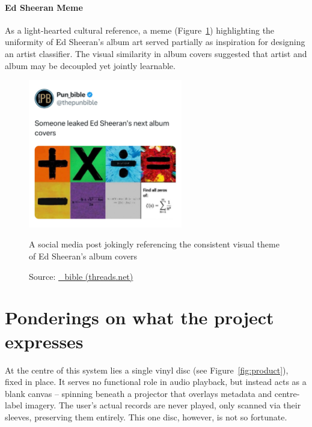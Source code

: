 \begin{uomappendix}
                \paragraph{Ed Sheeran Meme} As a light-hearted cultural reference, a meme (Figure~\ref{fig:EdMeme}) highlighting the uniformity of Ed Sheeran's album art served partially as inspiration for designing an artist classifier. The visual similarity in album covers suggested that artist and album may be decoupled yet jointly learnable.
    
                \begin{figure}[H]
                    \centering
                    \includegraphics[width=0.6\textwidth]{images/EdSheeranMeme.jpg}
                    \caption{A social media post jokingly referencing the consistent visual theme of Ed Sheeran's album covers}
                    \label{fig:EdMeme}
                    \caption*{Source: \href{https://www.threads.net/@pun_bible/post/DB83pw3gZSh/media}{\@pun\_bible (threads.net)}}
                \end{figure}
    
        \section{Ponderings on what the project expresses} \label{sec:nailArt}
    
        At the centre of this system lies a single vinyl disc (see Figure~\ref{fig:product}), fixed in place. It serves no functional role in audio playback, but instead acts as a blank canvas -- spinning beneath a projector that overlays metadata and centre-label imagery. The user's actual records are never played, only scanned via their sleeves, preserving them entirely. This one disc, however, is not so fortunate.
    

\end{uomappendix}
